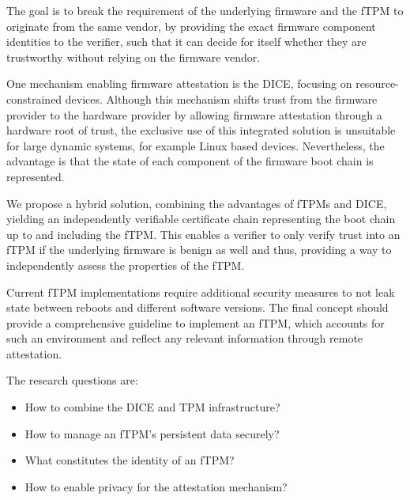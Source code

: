 The goal is to break the requirement of the underlying firmware and the fTPM to originate from the same vendor, by providing the exact firmware component identities to the verifier, such that it can decide for itself whether they are trustworthy without relying on the firmware vendor.


One mechanism enabling firmware attestation is the \ac{DICE}, focusing on resource-constrained devices. Although this mechanism shifts trust from the firmware provider to the hardware provider by allowing firmware attestation through a hardware root of trust, the exclusive use of this integrated solution is unsuitable for large dynamic systems, for example Linux based devices.
Nevertheless, the advantage is that the state of each component of the firmware boot chain is represented.


We propose a hybrid solution, combining the advantages of \acp{fTPM} and \ac{DICE}, yielding an independently verifiable certificate chain representing the boot chain up to and including the \ac{fTPM}.
This enables a verifier to only verify trust into an \ac{fTPM} if the underlying firmware is benign as well and thus, providing a way to independently assess the properties of the fTPM.

Current fTPM implementations require additional security measures to not leak state between reboots and different software versions.
The final concept should provide a comprehensive guideline to implement an fTPM, which accounts for such an environment and reflect any relevant information through remote attestation.

The research questions are:
\begin{itemize}
  \item How to combine the DICE and TPM infrastructure? %
  \item How to manage an fTPM's persistent data securely? %
  \item What constitutes the identity of an fTPM? %
  \item How to enable privacy for the attestation mechanism?
\end{itemize}


